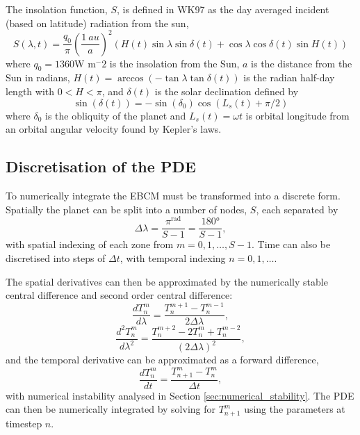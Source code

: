 \documentclass[12pt, onecolumn]{revtex4-2}    %
\begin{document}
The insolation function, $S$, is defined in WK97 as the day averaged incident (based on latitude) radiation from the sun,
$$
    S(\lambda, t) = \frac{q_0}{\pi} \left(\frac{\qty{1}{au}}{a}\right)^2 (H(t) \sin{\lambda} \sin{\delta(t)} + \cos{\lambda} \cos{\delta(t)} \sin{H(t)})
$$
where $q_0=1360 $W m$^-2$ is the insolation from the Sun,
$a$ is the distance from the Sun in radians,
$H(t) = \arccos(-\tan\lambda \tan \delta(t))$ is the radian half-day length with $0 < H < \pi$,
and $\delta(t)$ is the solar declination defined by
$$
    \sin(\delta(t)) = -\sin(\delta_0) \cos(L_s(t) + \pi/2)
$$
where $\delta_0$ is the obliquity of the planet and $L_s(t) = \omega t$ is orbital longitude from an orbital angular velocity found by Kepler's laws.

\subsection{Discretisation of the PDE} \label{sec:solve_PDE}

To numerically integrate the EBCM must be transformed into a discrete form. Spatially the planet can be split into a number of nodes, $S$, each separated by
\begin{equation*}
    \Delta\lambda = \frac{\pi^{\unit{\radian}}}{S - 1} = \frac{180\unit{\degree}}{S - 1},
\end{equation*}
with spatial indexing of each zone from $m=0, 1, \dots, S-1$.
Time can also be discretised into steps of $\Delta t$, with temporal indexing $n=0,1,\dots$.

The spatial derivatives can then be approximated by the numerically stable central difference and second order central difference:
\begin{equation} \label{eq:space_1}
    \frac{dT^m_n}{d\lambda} = \frac{T^{m+1}_n - T^{m-1}_n}{2 \Delta\lambda},
\end{equation}
\begin{equation} \label{eq:space_2}
    \frac{d^2T^m_n}{d\lambda^2} = \frac{T^{m+2}_n -2T^m_n + T^{m-2}_n}{(2 \Delta\lambda)^2},
\end{equation}
and the temporal derivative can be approximated as a forward difference,
\begin{equation} \label{eq:time_1}
    \frac{dT^m_n}{dt} = \frac{T^m_{n+1} - T^m_n}{\Delta t},
\end{equation}
with numerical instability analysed in Section \ref{sec:numerical_stability}.
The PDE can then be numerically integrated by solving for $T^{m}_{n+1}$ using the parameters at timestep $n$.
\end{document}
